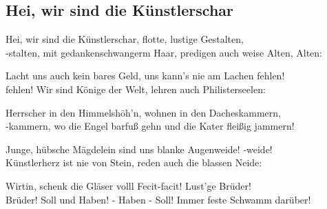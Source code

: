 
\subsection*{Hei, wir sind die Künstlerschar}
%

\thestrophe Hei, wir sind die Künstlerschar, flotte, lustige Gestalten, \\
-stalten, mit gedankenschwangerm Haar, predigen auch weise Alten, Alten: \\

\thestrophe Lacht uns auch kein bares Geld, uns kann's nie am Lachen fehlen! \\
fehlen! Wir sind Könige der Welt, lehren auch Philisterseelen: \\

\thestrophe Herrscher in den Himmelshöh'n, wohnen in den Dacheskammern, \\
-kammern, wo die Engel barfuß gehn und die Kater fleißig jammern! \\

\thestrophe Junge, hübsche Mägdelein sind uns blanke Augenweide! -weide! \\
Künstlerherz ist nie von Stein, reden auch die blassen Neide: \\

\thestrophe Wirtin, schenk die Gläser volll Fecit-facit! Lust'ge Brüder! \\
Brüder! Soll und Haben! - Haben - Soll! Immer feste Schwamm darüber! \\

